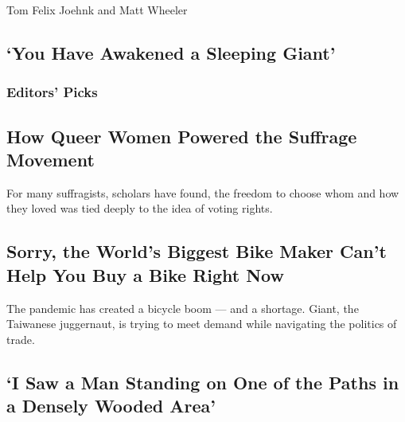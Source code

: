 \href{/2020/08/17/opinion/thailand-protests.html}{}

Tom Felix Joehnk and Matt Wheeler

\hypertarget{you-have-awakened-a-sleeping-giant}{%
\subsection{`You Have Awakened a Sleeping
Giant'}\label{you-have-awakened-a-sleeping-giant}}

\hypertarget{editors-picks}{%
\subsubsection{Editors' Picks}\label{editors-picks}}

\href{/2020/08/14/us/queer-lesbian-women-suffrage.html}{}

\hypertarget{how-queer-women-powered-the-suffrage-movement}{%
\subsection{How Queer Women Powered the Suffrage
Movement}\label{how-queer-women-powered-the-suffrage-movement}}

For many suffragists, scholars have found, the freedom to choose whom
and how they loved was tied deeply to the idea of voting rights.

\href{/2020/08/17/business/giant-bikes-coronavirus-shortage.html}{}

\hypertarget{sorry-the-worlds-biggest-bike-maker-cant-help-you-buy-a-bike-right-now}{%
\subsection{Sorry, the World's Biggest Bike Maker Can't Help You Buy a
Bike Right
Now}\label{sorry-the-worlds-biggest-bike-maker-cant-help-you-buy-a-bike-right-now}}

The pandemic has created a bicycle boom --- and a shortage. Giant, the
Taiwanese juggernaut, is trying to meet demand while navigating the
politics of trade.

\href{/2020/08/17/business/giant-bikes-coronavirus-shortage.html}{}

\href{/2020/08/16/nyregion/metropolitan-diary.html}{}

\hypertarget{i-saw-a-man-standing-on-one-of-the-paths-in-a-densely-wooded-area}{%
\subsection{`I Saw a Man Standing on One of the Paths in a Densely
Wooded
Area'}\label{i-saw-a-man-standing-on-one-of-the-paths-in-a-densely-wooded-area}}

